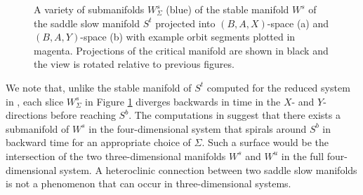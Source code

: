\documentclass{ws-ijbc}
\begin{document}
\begin{figure}[h]
\centering
{}
\caption{A variety of submanifolds $W^{s}_{\Sigma}$ (blue) of the stable manifold $W^s$ of the saddle slow manifold $S^t$ projected into $(B,A,X)$-space (a) and $(B,A,Y)$-space (b) with example orbit segments plotted in magenta.  Projections of the critical manifold are shown in black and the view is rotated relative to previous figures.}
\label{pieces}
\end{figure}
    
We note that, unlike the stable manifold of $S^t$ computed for the reduced system in \cite{QSSA}, each slice $W^{s}_{\Sigma}$ in Figure \ref{pieces} diverges backwards in time in the $X$- and $Y$- directions before reaching $S^b$.  The computations in \cite{QSSA} suggest that there exists a  submanifold of $W^s$ in the four-dimensional system that spirals around $S^b$ in backward time for an appropriate choice of $\Sigma$.  Such a surface would be the intersection of the two three-dimensional manifolds $W^s$ and $W^u$ in the full four-dimensional system.  A heteroclinic connection between two saddle slow manifolds is not a phenomenon that can occur in three-dimensional systems.
\end{document}
